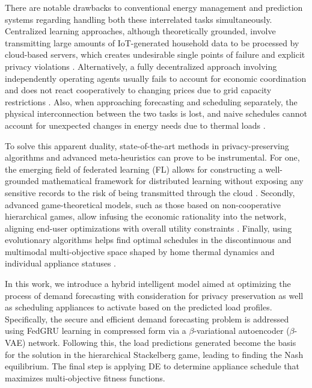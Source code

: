 \documentclass[journal]{IEEEtran}
\begin{document}
There are notable drawbacks to conventional energy management and prediction systems regarding handling both these interrelated tasks simultaneously. Centralized learning approaches, although theoretically grounded, involve transmitting large amounts of IoT-generated household data to be processed by cloud-based servers, which creates undesirable single points of failure and explicit privacy violations \cite{wang2024blockchain-based, fan2025adaptive}. Alternatively, a fully decentralized approach involving independently operating agents usually fails to account for economic coordination and does not react cooperatively to changing prices due to grid capacity restrictions \cite{lee2018light-weight}. Also, when approaching forecasting and scheduling separately, the physical interconnection between the two tasks is lost, and naive schedules cannot account for unexpected changes in energy needs due to thermal loads \cite{zhang2025demand, huang2019demand}.

To solve this apparent duality, state-of-the-art methods in privacy-preserving algorithms and advanced meta-heuristics can prove to be instrumental. For one, the emerging field of federated learning (FL) allows for constructing a well-grounded mathematical framework for distributed learning without exposing any sensitive records to the risk of being transmitted through the cloud \cite{mao2023communication-efficient, danish2025block-fedl:}. Secondly, advanced game-theoretical models, such as those based on non-cooperative hierarchical games, allow infusing the economic rationality into the network, aligning end-user optimizations with overall utility constraints \cite{dong2020energy}. Finally, using evolutionary algorithms helps find optimal schedules in the discontinuous and multimodal multi-objective space shaped by home thermal dynamics and individual appliance statuses \cite{zhang2025aggregator-grid}.

In this work, we introduce a hybrid intelligent model aimed at optimizing the process of demand forecasting with consideration for privacy preservation as well as scheduling appliances to activate based on the predicted load profiles. Specifically, the secure and efficient demand forecasting problem is addressed using FedGRU learning in compressed form via a $\beta$-variational autoencoder ($\beta$-VAE) network. Following this, the load predictions generated become the basis for the solution in the hierarchical Stackelberg game, leading to finding the Nash equilibrium. The final step is applying DE to determine appliance schedule that maximizes multi-objective fitness functions.
\end{document}
